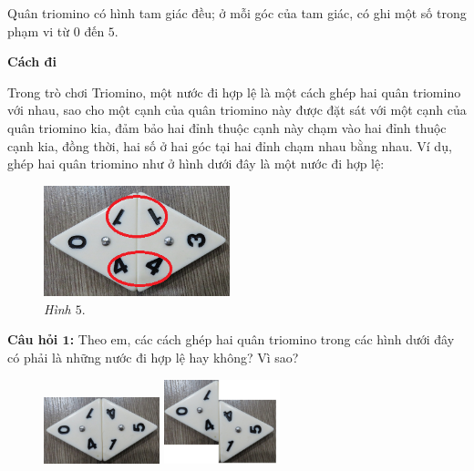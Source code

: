 	Quân triomino có hình tam giác đều; ở mỗi góc của tam giác, có ghi một số trong phạm vi từ $0$ đến $5$.
	\vskip 0.1cm
	\newpage
	{\textbf{\color{toancuabi} Cách đi}
	\begin{multicols}{2}
	Trong trò chơi Triomino, một nước đi hợp lệ là một cách ghép hai quân triomino với nhau, sao cho một cạnh của quân triomino này được đặt sát với một cạnh của quân \linebreak triomino kia, đảm bảo hai đỉnh thuộc cạnh này chạm vào hai đỉnh thuộc cạnh kia, đồng thời, hai số ở hai góc tại hai đỉnh chạm nhau
	bằng nhau. Ví dụ, ghép hai quân triomino như ở hình dưới đây là một nước đi hợp lệ:
	\begin{figure}[H]
		\centering
		\vspace*{-5pt}
		\captionsetup{labelformat=empty, justification=centering}
		\includegraphics[width=0.48\textwidth]{dom-09}
		\caption{\textit{\small Hình $5.$}}
	\end{figure}
	\end{multicols}
	\vspace*{-5pt}
	{\textbf{\color{toancuabi} Câu hỏi $\pmb{1}$:}  %
	\vskip 0.1cm
	Theo em, các cách ghép hai quân triomino trong các hình dưới đây có phải là những nước đi hợp lệ hay không? Vì sao?
	\begin{figure}[H]
		\centering
		\vspace*{-5pt}
		\captionsetup{labelformat=empty, justification=centering}
		\includegraphics[width=0.3\textwidth]{dom-10a}\quad
		\includegraphics[width=0.3\textwidth]{dom-10b}\quad

\end{figure}}}
